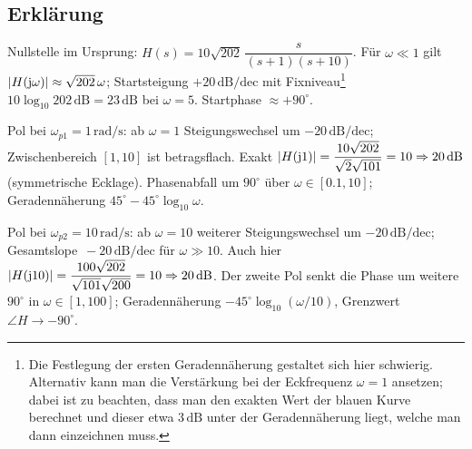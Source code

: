 \begin{center}
\end{center}
\newpage
\subsection{Erklärung}
\vspace{5mm}
\begin{description}[leftmargin=1.2em,labelsep=.6em,font=\bfseries]
\item[Schritt 1] Nullstelle im Ursprung: $H(s)=10\sqrt{202}\,\dfrac{s}{(s+1)(s+10)}$. Für $\omega\ll1$ gilt $|H(\operatorname{j}\!\omega)|\approx \sqrt{202}\,\omega$; Startsteigung $+20\,\mathrm{dB/dec}$ mit Fixniveau\footnote{Die Festlegung der ersten Geradennäherung gestaltet sich hier schwierig. Alternativ kann man die Verstärkung bei der Eckfrequenz $\omega=1$ ansetzen; dabei ist zu beachten, dass man den exakten Wert der blauen Kurve berechnet und dieser etwa $3\,\mathrm{dB}$ unter der Geradennäherung liegt, welche man dann einzeichnen muss.}$10\log_{10}202\,\mathrm{dB} = 23\,\mathrm{dB}$ bei $\omega = 5$. Startphase $\approx+90^\circ$.
\item[Schritt 2] Pol bei $\omega_{p1}=1\,\mathrm{rad/s}$: ab $\omega=1$ Steigungswechsel um $-20\,\mathrm{dB/dec}$; Zwischenbereich $[1,10]$ ist betragsflach. Exakt $|H(\operatorname{j}\!1)|=\dfrac{10\sqrt{202}}{\sqrt{2}\sqrt{101}}=10\Rightarrow20\,\mathrm{dB}$ (symmetrische Ecklage). Phasenabfall um $90^\circ$ über $\omega\in[0.1,10]$; Geradennäherung $45^\circ-45^\circ\log_{10}\omega$.
\item[Schritt 3] Pol bei $\omega_{p2}=10\,\mathrm{rad/s}$: ab $\omega=10$ weiterer Steigungswechsel um $-20\,\mathrm{dB/dec}$; Gesamtslope $\,-20\,\mathrm{dB/dec}$ für $\omega\gg10$. Auch hier $|H(\operatorname{j}\!10)|=\dfrac{100\sqrt{202}}{\sqrt{101}\sqrt{200}}=10\Rightarrow20\,\mathrm{dB}$. Der zweite Pol senkt die Phase um weitere $90^\circ$ in $\omega\in[1,100]$; Geradennäherung $-45^\circ\log_{10}(\omega/10)$, Grenzwert $\angle H\to-90^\circ$.
\end{description}

